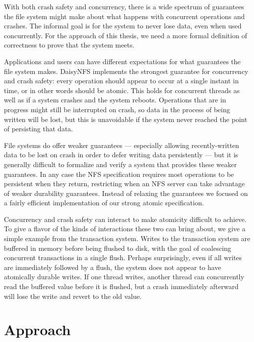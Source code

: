 With both crash safety and concurrency, there is a wide spectrum of guarantees
the file system might make about what happens with concurrent operations and
crashes. The informal goal is for the system to never lose data, even when used concurrently. For the approach of this thesis, we need a more formal
definition of correctness to prove that the system meets.

Applications and users can have different expectations for what guarantees the
file system makes. DaisyNFS implements the strongest guarantee for concurrency
and crash safety: every operation should appear to occur at a single instant in
time, or in other words should be atomic. This holds for concurrent threads as
well as if a system crashes and the system reboots. Operations that are in
progress might still be interrupted on crash, so data in the process of being
written will be lost, but this is unavoidable if the system never reached the
point of persisting that data.

File systems do offer weaker guarantees --- especially allowing recently-written
data to be lost on crash in order to defer writing data persistently
--- but it is generally difficult to formalize and verify a system that provides
these weaker guarantees. In any case the NFS specification requires most operations to be persistent
when they return, restricting when an NFS server can take advantage
of weaker durability guarantees. Instead of relaxing the guarantees we focused
on a fairly efficient implementation of our strong atomic specification.

Concurrency and crash safety can interact to make atomicity difficult to
achieve. To give a flavor of the kinds of interactions these two can bring
about, we give a simple example from the transaction system. Writes to the
transaction system are buffered in memory before being flushed to disk, with the
goal of coalescing concurrent transactions in a single flush. Perhaps
surprisingly, even if all writes are immediately followed by a flush, the system
does not appear to have atomically durable writes. If one thread writes, another
thread can concurrently read the buffered value before it is flushed, but a
crash immediately afterward will lose the write and revert to the old value.

\section{Approach}

